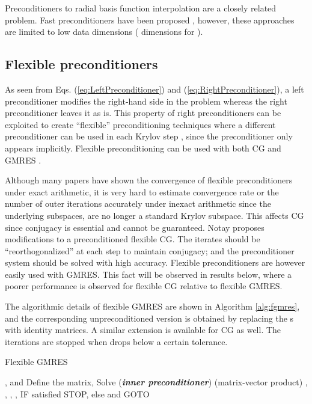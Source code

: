\documentclass[10pt,journal,letterpaper,compsoc]{IEEEtran}
\begin{document}
Preconditioners to radial basis function interpolation are a closely related problem. Fast preconditioners have been proposed \cite{RBF_Beatson, RBF_Faul, RBF_Gumerov}, however, these approaches are limited to low data dimensions ( dimensions for ).

\subsection{Flexible preconditioners}
As seen from Eqs. (\ref{eq:LeftPreconditioner}) and (\ref{eq:RightPreconditioner}), a left preconditioner modifies the right-hand side  in the problem whereas the right preconditioner leaves it as is. This property of right preconditioners can be exploited to create ``flexible'' preconditioning techniques where a different preconditioner can be used in each Krylov step \cite{FGMRES,FlexibleKrylov,FlexibleCG}, since the preconditioner only appears implicitly. Flexible preconditioning can be used with both CG \cite{FlexibleCG} and GMRES \cite{FGMRES}.

Although many papers have shown the convergence of flexible preconditioners under exact arithmetic, it is very hard to estimate convergence rate or the number of outer iterations accurately under inexact arithmetic since the underlying subspaces,  are no longer a standard Krylov subspace. This affects CG since conjugacy is essential and cannot be guaranteed. Notay \cite{FlexibleCG} proposes  modifications to a preconditioned flexible CG. The iterates should be ``reorthogonalized'' at each step to maintain conjugacy; and the preconditioner system should be solved with high accuracy. Flexible preconditioners are however easily used with GMRES. This fact will be observed in results below, where a poorer performance is observed for flexible CG relative to flexible GMRES.

The algorithmic details of flexible GMRES are shown in Algorithm \ref{alg:fgmres}, and the corresponding unpreconditioned version is obtained by replacing the s with identity matrices. A similar extension is available for CG as well. The iterations are stopped when  drops below a certain tolerance.

\begin{algorithm}[bth]
\caption{Flexible GMRES \cite{FGMRES}} \label{alg:fgmres}
\begin{algorithmic}[1]
\STATE ,  and 
\STATE Define the  matrix, 
    \STATE Solve  (\emph{\textbf{inner preconditioner}})
    \STATE  (matrix-vector product)
        \STATE , 
    \ENDFOR
    \STATE , 
\ENDFOR
\STATE ,
\STATE , 
\STATE IF satisfied STOP, else  and GOTO 
\end{algorithmic}
\end{algorithm}
\end{document}
